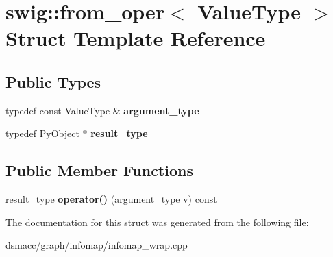 \hypertarget{structswig_1_1from__oper}{}\section{swig\+:\+:from\+\_\+oper$<$ Value\+Type $>$ Struct Template Reference}
\label{structswig_1_1from__oper}
\subsection*{Public Types}
\begin{DoxyCompactItemize}
\item 
\mbox{\label{structswig_1_1from__oper_a33151174816bb2d002b7b504bcfc1902}} 
typedef const Value\+Type \& {\bfseries argument\+\_\+type}
\item 
\mbox{\label{structswig_1_1from__oper_aceed5a894a65b69078106cda841f6021}} 
typedef Py\+Object $\ast$ {\bfseries result\+\_\+type}
\end{DoxyCompactItemize}
\subsection*{Public Member Functions}
\begin{DoxyCompactItemize}
\item 
\mbox{\label{structswig_1_1from__oper_a8c92f4feba24d5a1ee72e2fc25b38ce3}} 
result\+\_\+type {\bfseries operator()} (argument\+\_\+type v) const
\end{DoxyCompactItemize}


The documentation for this struct was generated from the following file\+:\begin{DoxyCompactItemize}
\item 
dsmacc/graph/infomap/infomap\+\_\+wrap.\+cpp\end{DoxyCompactItemize}
